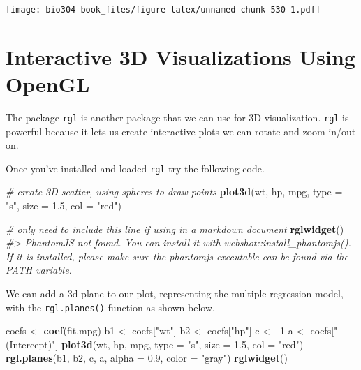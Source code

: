 \documentclass[]{book}
\newenvironment{Shaded}{\begin{snugshade}}{\end{snugshade}}
\newcommand{\CommentTok}[1]{\textcolor[rgb]{0.56,0.35,0.01}{\textit{#1}}}
\newcommand{\DataTypeTok}[1]{\textcolor[rgb]{0.13,0.29,0.53}{#1}}
\newcommand{\DecValTok}[1]{\textcolor[rgb]{0.00,0.00,0.81}{#1}}
\newcommand{\FloatTok}[1]{\textcolor[rgb]{0.00,0.00,0.81}{#1}}
\newcommand{\KeywordTok}[1]{\textcolor[rgb]{0.13,0.29,0.53}{\textbf{#1}}}
\newcommand{\NormalTok}[1]{#1}
\newcommand{\StringTok}[1]{\textcolor[rgb]{0.31,0.60,0.02}{#1}}
\theoremstyle{definition}
\theoremstyle{definition}
\theoremstyle{definition}
\theoremstyle{remark}
\begin{document}
\texttt{[image: bio304-book\_files/figure-latex/unnamed-chunk-530-1.pdf]}

\hypertarget{interactive-3d-visualizations-using-opengl}{%
\section{Interactive 3D Visualizations Using
OpenGL}\label{interactive-3d-visualizations-using-opengl}}

The package \texttt{rgl} is another package that we can use for 3D
visualization. \texttt{rgl} is powerful because it lets us create
interactive plots we can rotate and zoom in/out on.

Once you've installed and loaded \texttt{rgl} try the following code.

\begin{Shaded}
\begin{Highlighting}[]
\CommentTok{# create 3D scatter, using spheres to draw points}
\KeywordTok{plot3d}\NormalTok{(wt, hp, mpg, }
       \DataTypeTok{type =} \StringTok{"s"}\NormalTok{, }
       \DataTypeTok{size =} \FloatTok{1.5}\NormalTok{,}
       \DataTypeTok{col =} \StringTok{"red"}\NormalTok{)}

\CommentTok{# only need to include this line if using in a markdown document}
\KeywordTok{rglwidget}\NormalTok{() }
\CommentTok{#> PhantomJS not found. You can install it with webshot::install_phantomjs(). If it is installed, please make sure the phantomjs executable can be found via the PATH variable.}
\end{Highlighting}
\end{Shaded}

\hypertarget{rgl61079}{}

We can add a 3d plane to our plot, representing the multiple regression
model, with the \texttt{rgl.planes()} function as shown below.

\begin{Shaded}
\begin{Highlighting}[]
\NormalTok{coefs <-}\StringTok{ }\KeywordTok{coef}\NormalTok{(fit.mpg)}
\NormalTok{b1 <-}\StringTok{ }\NormalTok{coefs[}\StringTok{"wt"}\NormalTok{]}
\NormalTok{b2 <-}\StringTok{ }\NormalTok{coefs[}\StringTok{"hp"}\NormalTok{]}
\NormalTok{c <-}\StringTok{ }\DecValTok{-1}
\NormalTok{a <-}\StringTok{ }\NormalTok{coefs[}\StringTok{"(Intercept)"}\NormalTok{]}
\KeywordTok{plot3d}\NormalTok{(wt, hp, mpg, }
       \DataTypeTok{type =} \StringTok{"s"}\NormalTok{, }
       \DataTypeTok{size =} \FloatTok{1.5}\NormalTok{,}
       \DataTypeTok{col =} \StringTok{"red"}\NormalTok{)}
\KeywordTok{rgl.planes}\NormalTok{(b1, b2, c, a, }\DataTypeTok{alpha =} \FloatTok{0.9}\NormalTok{, }\DataTypeTok{color =} \StringTok{"gray"}\NormalTok{)}
\KeywordTok{rglwidget}\NormalTok{()}
\end{Highlighting}
\end{Shaded}
\end{document}
